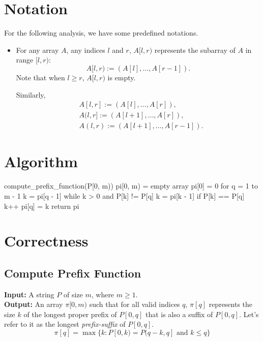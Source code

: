 \documentclass[12pt]{article}
\begin{document}
\section*{Notation}

For the following analysis, we have some predefined notations.
\begin{itemize}
    \item For any array \(A\), any indices \(l\) and \(r\), \(A[l, r)\) represents the subarray of \(A\) in range \([l, r)\):
    \[
        A[l, r) := (A[l], \dots, A[r-1]).
    \]
    Note that when \(l \geq r\), \(A[l, r)\) is empty.

    Similarly,
    \begin{align*}
        & A[l, r] := (A[l], \dots, A[r]), \\
        & A(l, r] := (A[l+1], \dots, A[r]), \\
        & A(l, r) := (A[l+1], \dots, A[r-1]).
    \end{align*}
\end{itemize}

\newpage

\section*{Algorithm}

\begin{pseudocode}
compute_prefix_function(P[0, m))
    pi[0, m) = empty array
    pi[0] = 0
    for q = 1 to m - 1
        k = pi[q - 1]
        while k > 0 and P[k] != P[q]
            k = pi[k - 1]
        if P[k] == P[q]
            k++
        pi[q] = k
    return pi
\end{pseudocode}

\section*{Correctness}

\subsection*{Compute Prefix Function}

\textbf{Input:} A string \(P\) of size \(m\), where \(m \geq 1\). \\
\textbf{Output:} An array \(\pi[0, m)\) such that for all valid indices \(q\), \(\pi[q]\) represents the size \(k\) of the longest proper prefix of \(P[0, q]\) that is also a suffix of \(P[0, q]\). Let's refer to it as the longest \textit{prefix-suffix} of \(P[0, q]\).
\begin{equation} %
    \pi[q] = \max\{k : P[0, k) = P(q-k, q] \text{ and } k \leq q \}
\end{equation}
\end{document}
